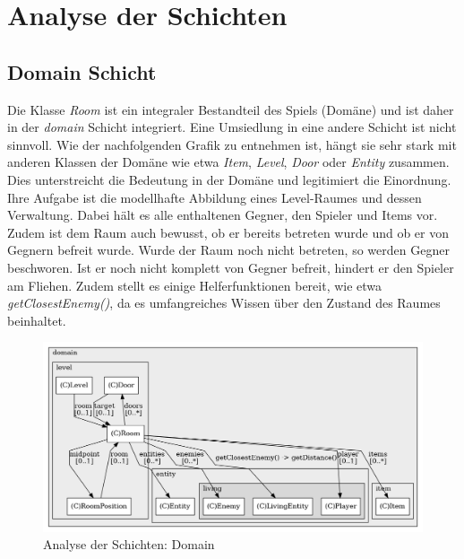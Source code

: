 \section{Analyse der Schichten}
\subsection*{Domain Schicht}
Die Klasse \textit{Room} ist ein integraler Bestandteil des Spiels
(Domäne) und ist daher in der \textit{domain} Schicht integriert. Eine
Umsiedlung in eine andere Schicht ist nicht sinnvoll. Wie der
nachfolgenden Grafik zu entnehmen ist, hängt sie sehr stark mit
anderen Klassen der Domäne wie etwa \textit{Item}, \textit{Level},
\textit{Door} oder \textit{Entity} zusammen. Dies unterstreicht die
Bedeutung in der Domäne und legitimiert die Einordnung. Ihre Aufgabe
ist die modellhafte Abbildung eines Level-Raumes und dessen Verwaltung.
Dabei hält es alle enthaltenen Gegner, den Spieler und Items vor. Zudem
ist dem Raum auch bewusst, ob er bereits betreten wurde und ob er von
Gegnern befreit wurde. Wurde der Raum noch nicht betreten, so werden
Gegner beschworen. Ist er noch nicht komplett von Gegner befreit, 
hindert er den Spieler am Fliehen. Zudem stellt es einige Helferfunktionen
bereit, wie etwa \textit{getClosestEnemy()}, da es umfangreiches Wissen
über den Zustand des Raumes beinhaltet.

\vspace{0.5cm}
\begin{figure}[H]
    \centering
    \includegraphics[width=0.9\linewidth]{Bilder/Visualisierung/Room_structure.png}
    \caption{Analyse der Schichten: Domain}
\end{figure}

